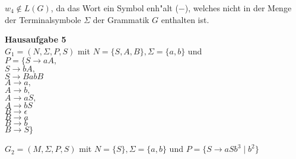 \documentclass[a4paper,12pt]{article}
\newcommand{\Aufgabe}[1]{
        {
        \vspace*{0.5cm}
        \textbf{Hausaufgabe #1}
        \vspace*{0.2cm}
    }
}
\begin{document}
$ w_4 \notin L(G) $, da das Wort ein Symbol enh"alt ($ - $), welches nicht in der Menge der Terminalsymbole $ \Sigma $ der Grammatik $ G $ enthalten ist.

\Aufgabe{5} \\
$ G_1 = (N, \Sigma, P, S) $ mit $ N = \{S, A, B\}, \Sigma = \{a, b\} $ und \\
$ P = \{S \rightarrow aA, $ \\
$ S \rightarrow bA, $ \\
$ S \rightarrow BabB $ \\
$ A \rightarrow a, $ \\
$ A \rightarrow b, $ \\
$ A \rightarrow aS, $ \\
$ A \rightarrow bS $ \\
$ B \rightarrow \epsilon $ \\
$ B \rightarrow a $ \\
$ B \rightarrow b $ \\
$ B \rightarrow S \} $ \\
\newpage

$ G_2 = (M, \Sigma, P, S) $ mit $ N = \{S\}, \Sigma = \{a, b\} $ und 
$ P = \{S \rightarrow aSb^{3} \mid b^{2}\} $
\end{document}
